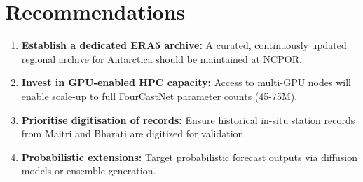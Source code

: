 \documentclass[12pt,titlepage,a4paper]{report}
\begin{document}
\chapter{Recommendations}
\begin{enumerate}
    \item \textbf{Establish a dedicated ERA5 archive:} A curated, continuously updated regional archive for Antarctica should be maintained at NCPOR.
    \item \textbf{Invest in GPU-enabled HPC capacity:} Access to multi-GPU nodes will enable scale-up to full FourCastNet parameter counts (45-75M).
    \item \textbf{Prioritise digitisation of records:} Ensure historical in-situ station records from Maitri and Bharati are digitized for validation.
    \item \textbf{Probabilistic extensions:} Target probabilistic forecast outputs via diffusion models or ensemble generation.
\end{enumerate}
\end{document}
